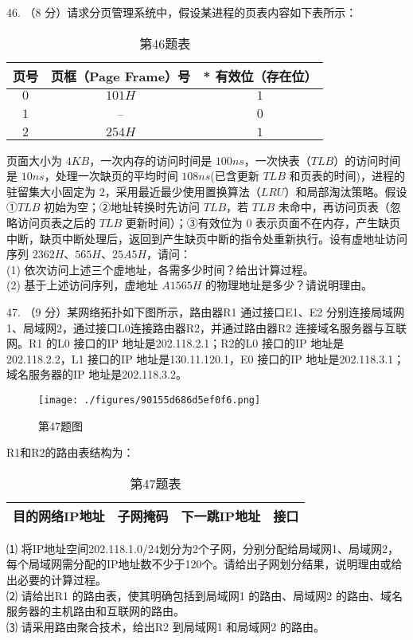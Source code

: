 46. （8 分）请求分页管理系统中，假设某进程的页表内容如下表所示：
\begin{table}[ht]
\centering
\caption{第46题表}\label{tab_CSN09_3}
\begin{tabular}{|c|c|c|}
\hline
页号 & 页框（Page Frame）号 & * 有效位（存在位） \\
\hline
$0$ & $101H$ & $1$ \\
\hline
$1$ & -- & $0$ \\
\hline
$2$ & $254H$ & $1$ \\
\hline
\end{tabular}
\end{table}
页面大小为 $4KB$，一次内存的访问时间是 $100ns$，一次快表（$TLB$）的访问时间是 $10ns$，处理一次缺页的平均时间 $108ns$(已含更新 $TLB$ 和页表的时间)，进程的驻留集大小固定为 $2$，采用最近最少使用置换算法（$LRU$）和局部淘汰策略。假设①$TLB$ 初始为空；②地址转换时先访问 $TLB$，若 $TLB$ 未命中，再访问页表（忽略访问页表之后的 $TLB$ 更新时间）；③有效位为 $0$ 表示页面不在内存，产生缺页中断，缺页中断处理后，返回到产生缺页中断的指令处重新执行。设有虚地址访问序列 $2362H$、$565H$、$25A5H$，请问： \\
(1) 依次访问上述三个虚地址，各需多少时间？给出计算过程。 \\
(2) 基于上述访问序列，虚地址 $A1565H$ 的物理地址是多少？请说明理由。

47. （9 分）某网络拓扑如下图所示，路由器R1 通过接口E1、E2 分别连接局域网1、局域网2，通过接口L0连接路由器R2，并通过路由器R2 连接域名服务器与互联网。R1 的L0 接口的IP 地址是202.118.2.1；R2的L0 接口的IP 地址是202.118.2.2，L1 接口的IP 地址是130.11.120.1，E0 接口的IP 地址是202.118.3.1；域名服务器的IP 地址是202.118.3.2。
\begin{figure}[ht]
\centering
\texttt{[image: ./figures/90155d686d5ef0f6.png]}
\caption{第47题图} \label{fig_CSN09_4}
\end{figure}
R1和R2的路由表结构为： \\
\begin{table}[ht]
\centering
\caption{第47题表}\label{tab_CSN09_4}
\begin{tabular}{|c|c|c|c|}
\hline
目的网络IP地址 & 子网掩码 & 下一跳IP地址 & 接口 \\
\hline
\end{tabular}
\end{table}
⑴ 将IP地址空间202.118.1.0/24划分为2个子网，分别分配给局域网1、局域网2，每个局域网需分配的IP地址数不少于120个。请给出子网划分结果，说明理由或给出必要的计算过程。 \\
⑵ 请给出R1 的路由表，使其明确包括到局域网1 的路由、局域网2 的路由、域名服务器的主机路由和互联网的路由。 \\
⑶ 请采用路由聚合技术，给出R2 到局域网1 和局域网2 的路由。

